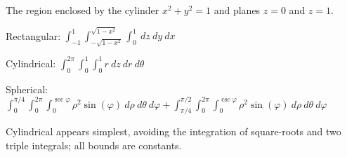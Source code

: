 {The region enclosed by the cylinder $x^2+y^2=1$ and planes $z=0$ and $z=1$.
}
{Rectangular: $\int_{-1}^{1}\int_{-\sqrt{1-x^2}}^{\sqrt{1-x^2}}\int_{0}^{1}\ dz\ dy\ dx$

Cylindrical: $\int_0^{2\pi}\int_0^1\int_{0}^{1}r\ dz\ dr\ d\theta$

Spherical: $\int_0^{\pi/4}\int_0^{2\pi}\int_0^{\sec\varphi} \rho^2\sin(\varphi)\ d\rho\ d\theta\ d\varphi + \int_{\pi/4}^{\pi/2}\int_0^{2\pi}\int_0^{\csc\varphi} \rho^2\sin(\varphi)\ d\rho\ d\theta\ d\varphi$

Cylindrical appears simplest, avoiding the integration of square-roots and two triple integrals; all bounds are constants.
}

